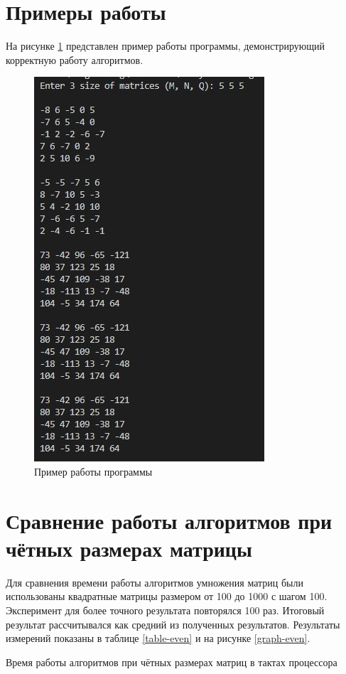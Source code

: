 \documentclass[12pt, a4paper]{report}
\begin{document}
	\section{Примеры работы}
	На рисунке \ref{pic:example} представлен пример работы программы, демонстрирующий корректную работу алгоритмов.
	\begin{figure}[ht!]
		\centering
		\includegraphics[scale=0.8]{example.jpg}
		\caption{Пример работы программы}
		\label{pic:example}
	\end{figure}
	
	\section{Сравнение работы алгоритмов при чётных размерах матрицы}
	Для сравнения времени работы алгоритмов умножения матриц были использованы квадратные матрицы размером от 100 до 1000 с шагом 100. Эксперимент для более точного результата повторялся 100 раз. Итоговый результат рассчитывался как средний из полученных результатов. Результаты измерений показаны в таблице \ref{table-even} и на рисунке \ref{graph-even}.\\
	\begin{table}[ht!]
		\caption{Время работы алгоритмов при чётных размерах матриц в тактах процессора}
		\label{table-even}
		\begin{center}
		\end{center}
	\end{table}
	
\end{document}
